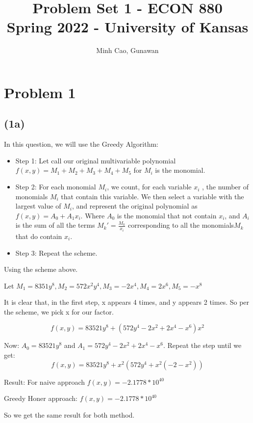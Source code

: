 \documentclass[11pt]{article}
\title{Problem Set 1 - ECON 880\\
	\small Spring 2022 - University of Kansas}
\author{Minh Cao, Gunawan}
\newcommand{\1}{\mathbbm{1}}
\begin{document}
\maketitle	
\section*{Problem 1}
\subsection*{(1a)}
In this question, we will use the Greedy Algorithm:\\
\begin{itemize}
\item Step 1: Let call our original multivariable polynomial $f(x,y) = M_{1} +M_{2}+M_{3}+M_{4}+M_{5}$ for $M_{i}$ is the monomial.\\
\item Step 2: For each monomial $M_{i}$, we count, for each variable $x_{i}$ , the number of monomials $M_{i}$
that contain this variable. We then select a variable with the largest value of $M_{i}$,  and represent the original
polynomial as $f(x,y) = A_{0}+A_{1}x_{i}$. Where $A_{0}$ is the monomial that not contain $x_{i}$, and $A_{i}$ is the sum of all the terms ${M_{k}}' = \frac{M_{k}}{x_{i}} $ corresponding to all the monomials$M_{k}$ that do contain $x_{i}$.\\
\item Step 3: Repeat the scheme.
\end{itemize}

Using the scheme above.

Let $M_{1} = 8351y^{8}, M_{2} = 572x^{2}y^{4}, M_{3}= -2x^{4}, M_{4}=2x^{6}, M_{5} = -x^{8}$

It is clear that, in the first step, x appears 4 times, and y appears  2 times. So per the scheme, we pick x for our factor.

$$f(x,y) = 83521y^8 + (572y^{4} - 2x^{2}+2x^{4}-x^{6})x^{2} $$

Now: $A_{0} = 83521y^8$ and $A_{1} = 572y^{4} - 2x^{2}+2x^{4}-x^{6}$. Repeat the step until we get:
$$f(x,y) = 83521y^8 +x^{2} (572y^{4} +x^{2}(-2-x^{2}))$$

Result: For naive approach $f(x,y) = -2.1778 * 10^{40}$

Greedy Honer approach: $f(x,y) = -2.1778  * 10^{40}$

So we get the same result for both method.
\end{document}
